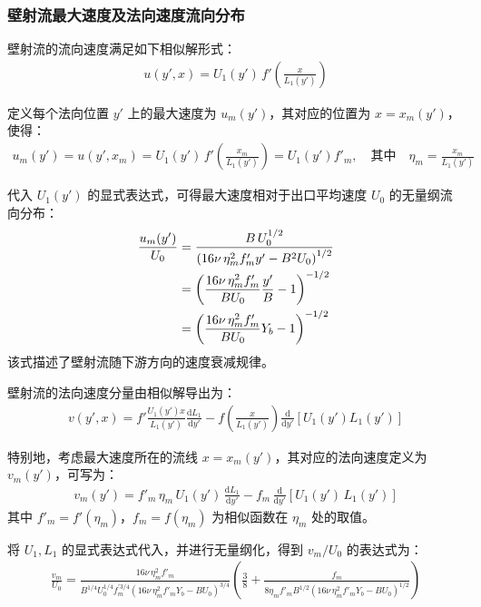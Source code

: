 \subsubsection{壁射流最大速度及法向速度流向分布}

壁射流的流向速度满足如下相似解形式：
\begin{align*}
    u(y',x) = U_{1}(y')\,f'\left(\frac{x}{L_{1}(y')}\right)
\end{align*}

定义每个法向位置 $y'$ 上的最大速度为 $u_{m}(y')$，其对应的位置为 $x = x_{m}(y')$，使得：
\begin{align*}
    u_{m}(y') = u(y', x_{m}) = U_{1}(y')\,f'\left(\frac{x_{m}}{L_{1}(y')}\right)
    = U_{1}(y') f'_{m}, \quad \text{其中}\quad \eta_{m} = \frac{x_{m}}{L_{1}(y')}
\end{align*}

代入 $U_{1}(y')$ 的显式表达式，可得最大速度相对于出口平均速度 $U_{0}$ 的无量纲流向分布：
\begin{align}
    \frac{u_{m}(y')}{U_{0}} &= \frac{B\,U_{0}^{1/2}}{\left(16\nu\,\eta^{2}_{m}f'_{m}y' - B^{2}U_{0}\right)^{1/2}} \notag \\
    &= \left( \frac{16\nu\,\eta_{m}^{2}f'_{m}}{B U_{0}} \frac{y'}{B} - 1 \right)^{-1/2} \notag \\
    &= \left( \frac{16\nu\,\eta_{m}^{2}f'_{m}}{B U_{0}} Y_{b} - 1 \right)^{-1/2} \label{eq:um_dist}
\end{align}
该式描述了壁射流随下游方向的速度衰减规律。

\vspace{0.5em}
壁射流的法向速度分量由相似解导出为：
\begin{align*}
    v(y', x) = f'\frac{U_{1}(y')x}{L_{1}(y')} \frac{\mathrm{d}L_{1}}{\mathrm{d}y'} - f\left(\frac{x}{L_{1}(y')}\right) \frac{\mathrm{d}}{\mathrm{d}y'}\left[U_{1}(y')L_{1}(y')\right]
\end{align*}

特别地，考虑最大速度所在的流线 $x = x_{m}(y')$，其对应的法向速度定义为 $v_{m}(y')$，可写为：
\begin{align*}
    v_{m}(y') = f'_{m}\,\eta_{m}\,U_{1}(y')\,\frac{\mathrm{d}L_{1}}{\mathrm{d}y'}
    - f_{m}\,\frac{\mathrm{d}}{\mathrm{d}y'}\left[ U_{1}(y')\,L_{1}(y') \right]
\end{align*}
其中 $f'_{m} = f'(\eta_{m})$，$f_{m} = f(\eta_{m})$ 为相似函数在 $\eta_{m}$ 处的取值。

将 $U_1, L_1$ 的显式表达式代入，并进行无量纲化，得到 $v_{m}/U_{0}$ 的表达式为：
\begin{align}
    \frac{v_{m}}{U_{0}} = \frac{16\nu\,\eta^{2}_{m}f'_{m}}{B^{1/4}U_{0}^{1/4}f_{m}^{'3/4}(16\nu\,\eta^{2}_{m}f'_{m}Y_{b}-BU_{0})^{3/4}}\left(\frac{3}{8}+\frac{f_{m}}{8\eta_{m}f'_{m}B^{1/2}(16\nu\,\eta^{2}_{m}f'_{m}Y_{b}-BU_{0})^{1/2}}\right)
    \label{eq:vm}
\end{align}

